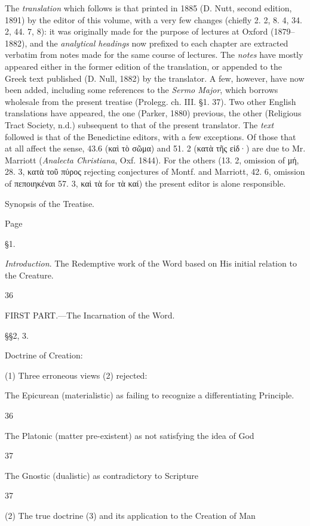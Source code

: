 The \emph{translation} which follows is that printed in 1885 (D. Nutt, second edition, 1891) by the editor of this volume, with a very few changes (chiefly 2. 2, 8. 4, 34. 2, 44. 7, 8): it was originally made for the purpose of lectures at Oxford (1879–1882), and the \emph{analytical headings} now prefixed to each chapter are extracted verbatim from notes made for the same course of lectures. The \emph{notes} have mostly appeared either in the former edition of the translation, or appended to the Greek text published (D. Null, 1882) by the translator. A few, however, have now been added, including some references to the \emph{Sermo Major}, which borrows wholesale from the present treatise (Prolegg. ch. III. §1. 37). Two other English translations have appeared, the one (Parker, 1880) previous, the other (Religious Tract Society, n.d.) subsequent to that of the present translator. The \emph{text} followed is that of the Benedictine editors, with a few exceptions. Of those that at all affect the sense, 43.6 (\textgreek{καὶ τὸ σῶμα}) and 51. 2 (\textgreek{κατὰ τῆς εἰδ·}) are due to Mr. Marriott (\emph{Analecta Christiana}, Oxf. 1844). For the others (13. 2, omission of \textgreek{μή}, 28. 3, \textgreek{κατὰ τοῦ πύρος} rejecting conjectures of Montf. and Marriott, 42. 6, omission of \textgreek{πεποιηκέναι} 57. 3, \textgreek{καὶ τὰ} for \textgreek{τὰ καί}) the present editor is alone responsible.

Synopsis of the Treatise.

Page

§1.

\emph{Introduction}. The Redemptive work of the Word based on His initial relation to the Creature.

36

FIRST PART.—The Incarnation of the Word.

§§2, 3.

Doctrine of Creation:

(1) Three erroneous views (2) rejected:

The Epicurean (materialistic) as failing to recognize a differentiating Principle.

36

The Platonic (matter pre-existent) as not satisfying the idea of God

37

The Gnostic (dualistic) as contradictory to Scripture

37

(2) The true doctrine (3) and its application to the Creation of Man


